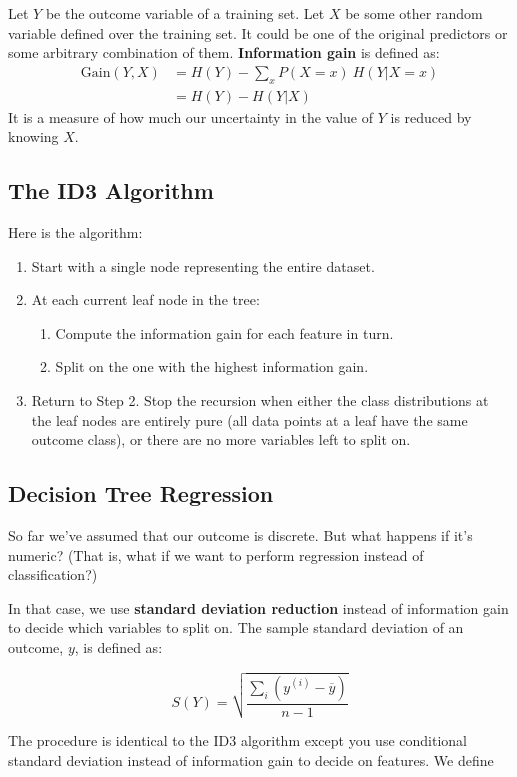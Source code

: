 Let $Y$ be the outcome variable of a training set. Let $X$ be some other random variable defined over the training set. It could be one of the original predictors or some arbitrary combination of them. \textbf{Information gain} is defined as:
\begin{align*} \text{Gain}(Y, X) &= H(Y) - \sum_{x} P(X = x)~ H(Y|X=x) \\
&= H(Y) - H(Y|X) \end{align*}
It is a measure of how much our uncertainty in the value of $Y$ is reduced by knowing $X$. 

\subsection{The ID3 Algorithm}

Here is the algorithm:
\begin{enumerate}
\item Start with a single node representing the entire dataset.
\item At each current leaf node in the tree:
\begin{enumerate}
\item Compute the information gain for each feature in turn.
\item Split on the one with the highest information gain.
\end{enumerate}
\item Return to Step 2. Stop the recursion when either the class distributions at the leaf nodes are entirely pure (all data points at a leaf have the same outcome class), or there are no more variables left to split on.
\end{enumerate}

\subsection{Decision Tree Regression}

So far we've assumed that our outcome is discrete. But what happens if it's numeric? (That is, what if we want to perform regression instead of classification?)

In that case, we use \textbf{standard deviation reduction} instead of information gain to decide which variables to split on. The sample standard deviation of an outcome, $y$, is defined as:

$$ S(Y) = \sqrt{\frac{\sum_i(y^{(i)} - \overline{y})}{n-1}} $$

The procedure is identical to the ID3 algorithm except you use conditional standard deviation instead of information gain to decide on features. We define


